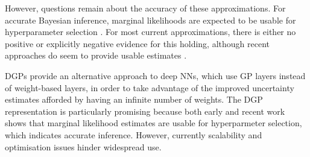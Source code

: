 However, questions remain about the accuracy of these approximations. %
For accurate Bayesian inference, marginal likelihoods are expected to be usable for hyperparameter selection \citep{mackay1992bmc,mackay2003information}. For most current approximations, there is either no positive or explicitly negative \citep{blundell2015} evidence for this holding, although recent approaches do seem to provide usable estimates \citep{ober2020global,immer2021marglik}.

DGPs \citep{Damianou2013} provide an alternative approach to deep NNs, which use GP layers instead of weight-based layers, in order to take advantage of the improved uncertainty estimates afforded by having an infinite number of weights. %
The DGP representation is particularly promising because both early and recent work \citep{Damianou2013,damianou2015thesis,Dutordoir2020convolutional} shows that marginal likelihood estimates are usable for hyperparmeter selection, which indicates accurate inference. However, currently scalability and optimisation issues hinder widespread use. 




